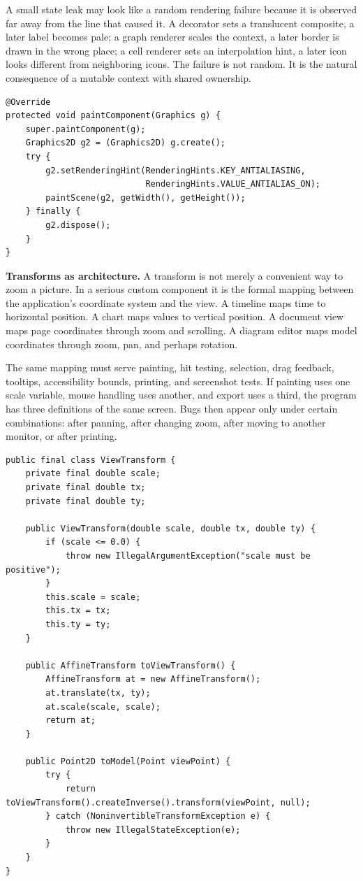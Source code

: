 A small state leak may look like a random rendering failure because it is observed far away from the line that caused it. A decorator sets a translucent composite, a later label becomes pale; a graph renderer scales the context, a later border is drawn in the wrong place; a cell renderer sets an interpolation hint, a later icon looks different from neighboring icons. The failure is not random. It is the natural consequence of a mutable context with shared ownership.

\begin{lstlisting}[caption={A local graphics context for a custom painter.}]
@Override
protected void paintComponent(Graphics g) {
    super.paintComponent(g);
    Graphics2D g2 = (Graphics2D) g.create();
    try {
        g2.setRenderingHint(RenderingHints.KEY_ANTIALIASING,
                            RenderingHints.VALUE_ANTIALIAS_ON);
        paintScene(g2, getWidth(), getHeight());
    } finally {
        g2.dispose();
    }
}
\end{lstlisting}

\textbf{Transforms as architecture.} A transform is not merely a convenient way to zoom a picture. In a serious custom component it is the formal mapping between the application's coordinate system and the view. A timeline maps time to horizontal position. A chart maps values to vertical position. A document view maps page coordinates through zoom and scrolling. A diagram editor maps model coordinates through zoom, pan, and perhaps rotation.

The same mapping must serve painting, hit testing, selection, drag feedback, tooltips, accessibility bounds, printing, and screenshot tests. If painting uses one scale variable, mouse handling uses another, and export uses a third, the program has three definitions of the same screen. Bugs then appear only under certain combinations: after panning, after changing zoom, after moving to another monitor, or after printing.

\begin{lstlisting}[caption={A small viewport transform object for a zoomable canvas.}]
public final class ViewTransform {
    private final double scale;
    private final double tx;
    private final double ty;

    public ViewTransform(double scale, double tx, double ty) {
        if (scale <= 0.0) {
            throw new IllegalArgumentException("scale must be positive");
        }
        this.scale = scale;
        this.tx = tx;
        this.ty = ty;
    }

    public AffineTransform toViewTransform() {
        AffineTransform at = new AffineTransform();
        at.translate(tx, ty);
        at.scale(scale, scale);
        return at;
    }

    public Point2D toModel(Point viewPoint) {
        try {
            return toViewTransform().createInverse().transform(viewPoint, null);
        } catch (NoninvertibleTransformException e) {
            throw new IllegalStateException(e);
        }
    }
}
\end{lstlisting}

